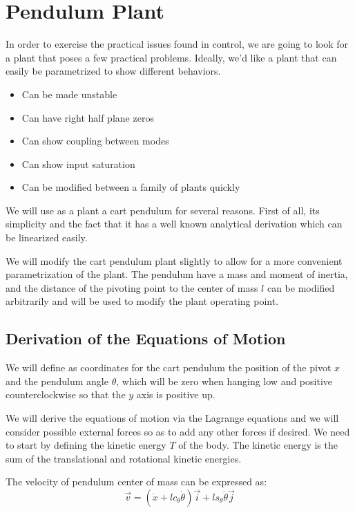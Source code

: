 \section{ Pendulum Plant}
In order to exercise the practical issues found in control, we are going to look for a plant that poses a few practical problems. Ideally, we'd like a plant that can easily be parametrized to show different behaviors.
\begin{itemize}
	\item Can be made unstable
	\item Can have right half plane zeros
	\item Can show coupling between modes
	\item Can show input saturation
	\item Can be modified between a family of plants quickly
\end{itemize}

We will use as a plant a cart pendulum for several reasons. First of all, its simplicity and the fact that it has a well known analytical derivation which can be linearized easily.

We will modify the cart pendulum plant slightly to allow for a more convenient parametrization of the plant. The pendulum have a mass and moment of inertia, and the distance of the pivoting point to the center of mass $l$ can be modified arbitrarily and will be used to modify the plant operating point.

\subsection{Derivation of the Equations of Motion}
We will define as coordinates for the cart pendulum the position of the pivot $x$ and the pendulum angle $\theta$, which will be zero when hanging low and positive counterclockwise so that the $y$ axis is positive up. 

We will derive the equations of motion via the Lagrange equations and we will consider possible external forces so as to add any other forces if desired. We need to start by defining the kinetic energy $T$ of the body. The kinetic energy is the sum of the translational and rotational kinetic energies.

The velocity of pendulum center of mass can be expressed as:
\begin{equation}
	\vec{v} = \left(\dot{x} + l c_\theta \dot{\theta} \right) \vec{i}
	         			    + l s_\theta \dot{\theta}         \vec{j}
\end{equation}

